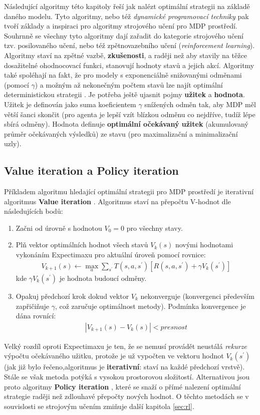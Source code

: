 Následující algoritmy této kapitoly řeší jak nalézt optimální strategii na základě daného modelu. Tyto algoritmy, nebo též \textit{dynamické programovací techniky} \cite{RLpaper} pak tvoří základy a inspiraci pro algoritmy strojového učení pro MDP prostředí. Souhrnně se všechny tyto algoritmy dají zařadit do kategorie strojového učení tzv. posilovaného učení, nebo též zpětnovazebního učení (\textit{reinforcement learning}). Algoritmy staví na zpětné vazbě, \textbf{zkušenosti}, a raději než aby stavily na těžce dosažitelné ohodnocovací funkci, stanovují hodnoty stavů a jejich akcí. Algoritmy také spoléhají na fakt, že pro modely s exponenciálně snižovanými odměnami (pomocí $\gamma$) a možným až nekonečným počtem stavů lze najít optimální deterministickou strategii  \cite{RLAprox}. Je potřeba ještě ujasnit pojmy \textbf{užitek} a \textbf{hodnota}. Užitek \cite{agents} je definován jako suma koeficientem $\gamma$ snížených odměn tak, aby MDP měl větší šanci skončit (pro agenta je lepší vzít blízkou odměnu co nejdříve, tudíž lépe sbírá odměny). Hodnota \cite{agents} definuje \textbf{optimální očekávaný užitek} (akumulovaný průměr očekávaných výsledků) ze stavu (pro maximalizační a minimalizační uzly).

\subsection*{Value iteration a Policy iteration}
\label{teorie:valiter}
Příkladem algoritmu hledající optimální strategii pro MDP prostředí je iterativní algoritmus \textbf{Value iteration} \cite{RLAprox}. Algoritmus staví na přepočtu V-hodnot dle následujících bodů:
\begin{enumerate}
\item Začni od úrovně s hodnotou $V_{0} = 0$ pro všechny stavy.
\item Plň vektor optimálních hodnot všech stavů $V_{k}(s)$ novými hodnotami vykonáním Expectimaxu pro aktuální úroveň pomocí rovnice:
\begin{align}
\label{eq:valiter}
V_{k+1}(s) \leftarrow \max_a \sum_{s^\prime}T(s,a,s^\prime) \left[R(s,a,s^\prime)+\gamma V_k(s^\prime) \right]
\end{align}
kde $\gamma V_k(s^\prime)$ je hodnota budoucí odměny.
\item Opakuj předchozí krok dokud vektor $V_k$ nekonverguje (konvergenci především zapřičiňuje $\gamma$, což zaručuje optimálnost metody). Podmínka konvergence je dána rovnící:
\begin{align}
\left|V_{k+1}(s)-V_k(s) \right| < presnost
\end{align}
\end{enumerate}
Velký rozdíl oproti Expectimaxu je ten, že se nemusí provádět neustálá \textit{rekurze} výpočtu očekávaného užitku, protože je už vypočten ve vektoru hodnot $V_k(s^\prime)$ (jak již bylo řečeno,algoritmus je \textbf{iterativní}: staví na každé předchozí vrstvě). Stále se však metoda potýká s vysokou prostorovou složitostí. Alternativou jsou proto algoritmy \textbf{Policy iteration} \cite{RLAprox}, které se snaží o přímé nalezení optimální strategie raději než zdlouhavé přepočty nových hodnot. O těchto metodách se v souvislosti se strojovým učením zmiňuje další kapitola \ref{sec:rl}.


